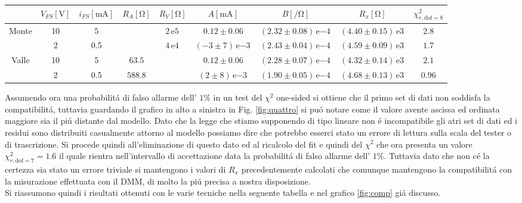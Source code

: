 \documentclass{article}
\newcommand{\E}[1]{\, \mathrm{e}{#1} \, }
\begin{document}
\hspace{-2cm}
\vspace{12pt}
\begin{tabular}{c|c|c|c|c|c|c|c|c}
	& $V_{FS} [\si{\volt}]$ & $i_{FS} [\si{\milli\ampere}]$ & $R_A [\si{\ohm}]$ & $R_V [\si{\ohm}]$ & $A [\si{\milli\ampere}]$ & $B [\si{\per\ohm}]$ & $R_x [\si{\ohm}]$ & $\chi ^2_{r,\mathrm{dof}=8}$ \\
	\hline
	Monte 
	& 10 & 5 &  & $2 \E{5}$ & $0.12 \pm 0.06$ & $(2.32 \pm 0.08)\E{-4}$ & $(4.40 \pm 0.15)\E{3}$ & $2.8$ \\
	& 2 & 0.5 &  & $4 \E{4}$ & $(-3 \pm 7)\E{-3}$ & $(2.43 \pm 0.04)\E{-4}$ & $(4.59\pm0.09)\E{3}$ & $1.7$ \\
	Valle 
	& 10 & 5 & $63.5$ &  & $0.12 \pm 0.06$ & $(2.28 \pm 0.07)\E{-4}$ & $(4.32 \pm 0.14)\E{3}$ & $2.1$ \\
	& 2 & 0.5 & $588.8$ &  & $(2 \pm 8)\E{-3}$ & $(1.90 \pm 0.05)\E{-4}$ & $(4.68\pm0.13)\E{3}$ & $0.96$
\end{tabular}

Assumendo ora una probabilit\'a di falso allarme dell' $1 \%$ in un test del $\chi^2$ one-sided si ottiene che il primo set di dati non soddisfa la compatibilit\'a, tuttavia guardando il grafico in alto a sinistra in Fig. \ref{fig:quattro} si pu\'o notare come il valore avente ascissa ed ordinata maggiore sia il pi\'u distante dal modello. Dato che la legge che stiamo supponendo di tipo lineare non \'e incompatibile gli atri set di dati ed i residui sono distribuiti casualmente attorno al modello possiamo dire che potrebbe esserci stato un errore di lettura sulla scala del tester o di trascrizione. Si procede quindi all'eliminazione di questo dato ed al ricalcolo del fit e quindi del $\chi^2$ che ora presenta un valore $\chi^2_{r,\mathrm{dof}=7}=1.6$ il quale rientra nell'intervallo di accettazione data la probabilit\'a di falso allarme dell' $1\%$. Tuttavia dato che non c\'e la certezza sia stato un errore triviale si mantengono i valori di $R_x$ precedentemente calcolati che comunque mantengono la compatibilit\'a con la misurazione effettuata con il DMM, di molto la pi\'u precisa a nostra disposizione.\\

Si riassumono quindi i risultati ottenuti con le varie tecniche nella seguente tabella e nel grafico \ref{fig:comp} gi\'a discusso. \\
\end{document}
